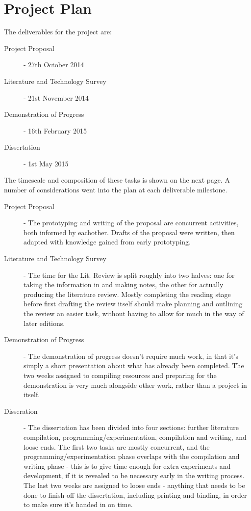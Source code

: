 \documentclass{article}
\begin{document}
\newpage
\section{Project Plan}
\label{sec:project-plan}
The deliverables for the project are:
\begin{description}
	\item[Project Proposal] - 27th October 2014
	\item[Literature and Technology Survey] - 21st November 2014
	\item[Demonstration of Progress] - 16th February 2015
	\item[Dissertation] - 1st May 2015
\end{description}

The timescale and composition of these tasks is shown on the next page. A number of considerations went into the plan at each deliverable milestone.
\begin{description}
	\item[Project Proposal] - The prototyping and writing of the proposal are concurrent activities, both informed by eachother. Drafts of the proposal were written, then adapted with knowledge gained from early prototyping.
	\item[Literature and Technology Survey] - The time for the Lit. Review is split roughly into two halves: one for taking the information in and making notes, the other for actually producing the literature review. Mostly completing the reading stage before first drafting the review itself should make planning and outlining the review an easier task, without having to allow for much in the way of later editions.
	\item[Demonstration of Progress] - The demonstration of progress doesn't require much work, in that it's simply a short presentation about what has already been completed. The two weeks assigned to compiling resources and preparing for the demonstration is very much alongside other work, rather than a project in itself.
	\item[Disseration] - The dissertation has been divided into four sections: further literature compilation, programming/experimentation, compilation and writing, and loose ends. The first two tasks are mostly concurrent, and the programming/experimentation phase overlaps with the compilation and writing phase - this is to give time enough for extra experiments and development, if it is revealed to be necessary early in the writing process. The last two weeks are assigned to loose ends - anything that needs to be done to finish off the dissertation, including printing and binding, in order to make sure it's handed in on time.
\end{description}
\end{document}
